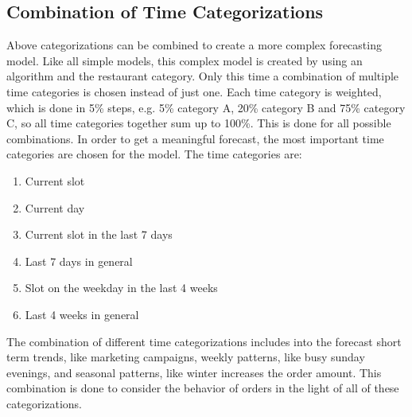 \subsection{Combination of Time Categorizations}\label{subsection:Categorizing by Order}
Above categorizations can be combined to create a more complex forecasting model. Like all simple models, this complex model is created by using an algorithm and the restaurant category. Only this time a combination of multiple time categories is chosen instead of just one. Each time category is weighted, which is done in 5\% steps, e.g. 5\% category A, 20\% category B and 75\% category C, so all time categories together sum up to 100\%.  This is done for all possible combinations. In order to get a meaningful forecast, the most important time categories are chosen for the model. The time categories are:
\begin{enumerate}
\item Current slot
\item Current day
\item Current slot in the last 7 days
\item Last 7 days in general
\item Slot on the weekday in the last 4 weeks
\item Last 4 weeks in general
\end{enumerate}

The combination of different time categorizations includes into the forecast short term trends, like marketing campaigns, weekly patterns, like busy sunday evenings, and seasonal patterns, like winter increases the order amount.\newline
This combination is done to consider the behavior of orders in the light of all of these categorizations.
